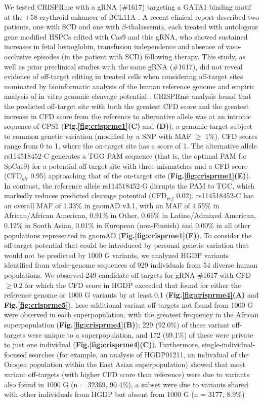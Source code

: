 \documentclass[a4paper, titlepage, openright]{book}
\newcommand{\crisprme}{CRISPRme\xspace}
\begin{document}
We tested \crisprme with a gRNA (\#1617) targeting a GATA1 binding motif at the +58 erythroid enhancer of BCL11A \citep{canver2015bcl11a, wu2019highly}. A recent clinical report described two patients, one with SCD and one with $\beta$-thalassemia, each treated with autologous gene modified HSPCs edited with Cas9 and this gRNA, who showed sustained increases in fetal hemoglobin, transfusion independence and absence of vaso-occlusive episodes (in the patient with SCD) following therapy. This study, as well as prior preclinical studies with the same gRNA (\#1617), did not reveal evidence of off-target editing in treated cells when considering off-target sites nominated by bioinformatic analysis of the human reference genome and empiric analysis of in vitro genomic cleavage potential \citep{frangoul2021crispr, wu2019highly, demirci2019durable}.  \crisprme analysis found that the predicted off-target site with both the greatest CFD score and the greatest increase in CFD score from the reference to alternative allele was at an intronic sequence of CPS1 (\textbf{Fig.\ref{fig:crisprme1}(C)} and \textbf{(D)}),  a genomic target subject to common genetic variation (modified by a SNP with MAF $\geq$ 1\%). CFD scores range from 0 to 1, where the on-target site has a score of 1. The alternative allele rs114518452-C generates a TGG PAM sequence (that is, the optimal PAM for SpCas9) for a potential off-target site with three mismatches and a CFD score (CFD$_{alt}$ 0.95) approaching that of the on-target site (\textbf{Fig.\ref{fig:crisprme1}(E)}). In contrast, the reference allele rs114518452-G disrupts the PAM to TGC, which markedly reduces predicted cleavage potential (CFD$_{ref}$ 0.02). rs114518452-C has an overall MAF of 1.33\% in gnomAD v3.1, with an MAF of 4.55\% in African/African American, 0.91\% in Other, 0.66\% in Latino/Admixed American, 0.12\% in South Asian, 0.01\% in European (non-Finnish) and 0.00\% in all other populations represented in gnomAD (\textbf{Fig.\ref{fig:crisprme1}(F)}). To consider the off-target potential that could be introduced by personal genetic variation that would not be predicted by 1000 G variants, we analyzed HGDP variants identified from whole-genome sequences of 929 individuals from 54 diverse human populations. We observed 249 candidate off-targets for gRNA \#1617 with CFD $\geq 0.2$ for which the CFD score in HGDP exceeded that found for either the reference genome or 1000 G variants by at least 0.1 (\textbf{Fig.\ref{fig:crisprme4}(A)} and \textbf{Fig.\ref{fig:crisprme5}}). hese additional variant off-targets not found from 1000 G were observed in each superpopulation, with the greatest frequency in the African superpopulation (\textbf{Fig.\ref{fig:crisprme4}(B)}); 229 (92.0\%) of these variant off-targets were unique to a superpopulation, and 172 (69.1\%) of these were private to just one individual (\textbf{Fig.\ref{fig:crisprme4}(C)}). Furthermore, single-individual-focused searches (for example, an analysis of HGDP01211, an individual of the Oroqen population within the East Asian superpopulation) showed that most variant off-targets (with higher CFD score than reference) were due to variants also found in 1000 G (n = 32369, 90.4\%), a subset were due to variants shared with other individuals from HGDP but absent from 1000 G (n = 3177, 8.9\%) 
\end{document}
